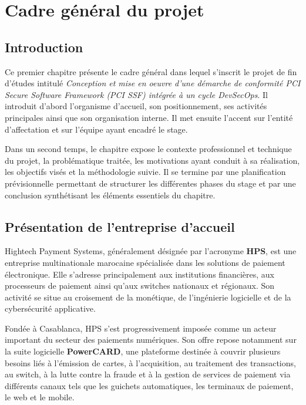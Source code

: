\documentclass[12pt,a4paper]{report}
\begin{document}

\chapter{Cadre général du projet}

\section{Introduction}

Ce premier chapitre présente le cadre général dans lequel s'inscrit le projet de fin d'études intitulé \textit{Conception et mise en oeuvre d'une démarche de conformité PCI Secure Software Framework (PCI SSF) intégrée à un cycle DevSecOps}. Il introduit d'abord l'organisme d'accueil, son positionnement, ses activités principales ainsi que son organisation interne. Il met ensuite l'accent sur l'entité d'affectation et sur l'équipe ayant encadré le stage.

Dans un second temps, le chapitre expose le contexte professionnel et technique du projet, la problématique traitée, les motivations ayant conduit à sa réalisation, les objectifs visés et la méthodologie suivie. Il se termine par une planification prévisionnelle permettant de structurer les différentes phases du stage et par une conclusion synthétisant les éléments essentiels du chapitre.

\section{Présentation de l'entreprise d'accueil}

Hightech Payment Systems, généralement désignée par l'acronyme \textbf{HPS}, est une entreprise multinationale marocaine spécialisée dans les solutions de paiement électronique. Elle s'adresse principalement aux institutions financières, aux processeurs de paiement ainsi qu'aux switches nationaux et régionaux. Son activité se situe au croisement de la monétique, de l'ingénierie logicielle et de la cybersécurité applicative.

Fondée à Casablanca, HPS s'est progressivement imposée comme un acteur important du secteur des paiements numériques. Son offre repose notamment sur la suite logicielle \textbf{PowerCARD}, une plateforme destinée à couvrir plusieurs besoins liés à l'émission de cartes, à l'acquisition, au traitement des transactions, au switch, à la lutte contre la fraude et à la gestion de services de paiement via différents canaux tels que les guichets automatiques, les terminaux de paiement, le web et le mobile.
\end{document}

